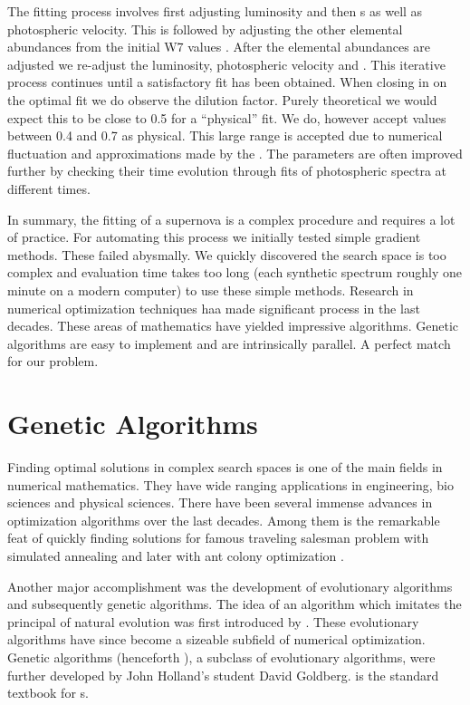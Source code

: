 The fitting process involves first adjusting luminosity and then \ige s as well as photospheric velocity. This is followed by adjusting the other elemental abundances from the initial W7 values \citep{1984ApJ...286..644N}. After the elemental abundances are adjusted we re-adjust the luminosity, photospheric velocity and \ige. This iterative process continues until a satisfactory fit has been obtained. When closing in on the optimal fit we do observe the dilution factor. Purely theoretical we would expect this to be close to 0.5 for a ``physical'' fit. We do, however accept values between 0.4 and 0.7 as physical. This large range is accepted due to numerical fluctuation and approximations made by the \mlc. The parameters are often improved further by checking their time evolution through fits of photospheric spectra at different times.


In summary, the fitting of a supernova is a complex procedure and requires a lot of practice. For automating this process we initially tested simple gradient methods. These failed abysmally. We quickly discovered the search space is too complex and evaluation time takes too long (each synthetic spectrum roughly one minute on a modern computer) to use these simple methods. Research in numerical optimization techniques haa made significant process in the last decades. These areas of mathematics have yielded impressive algorithms. Genetic algorithms are easy to implement and are intrinsically parallel. A perfect match for our problem.

 
\section{Genetic Algorithms}
\label{sec:intro_ga}

Finding optimal solutions in complex search spaces is one of the main fields in numerical mathematics.  They have wide ranging applications in engineering, bio sciences and physical sciences. There have been several immense advances in optimization algorithms over the last decades.
Among them is the  remarkable feat of quickly finding solutions for famous traveling salesman problem with simulated annealing \citep{Kirkpatrick13051983} and later with ant colony optimization \citep{Dorigo97antcolonies}.

Another major accomplishment was the development of evolutionary algorithms and subsequently genetic algorithms. The idea of an algorithm which imitates the principal of natural evolution was first introduced by \cite{Holland:1962:OLT:321127.321128}. These evolutionary algorithms have since become a sizeable subfield of numerical optimization. Genetic algorithms (henceforth \ga), a subclass of evolutionary algorithms, were further developed by John Holland's student David Goldberg.  \citep{citeulike:125978} is the standard textbook for \ga s.


